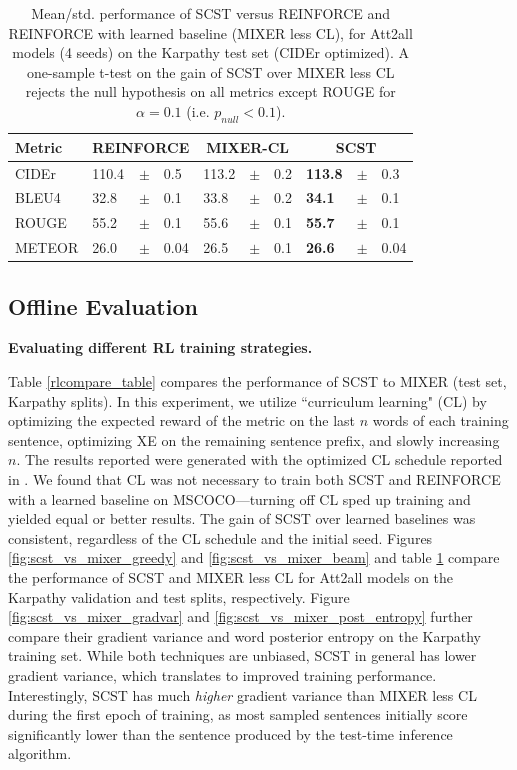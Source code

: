 \documentclass[10pt,twocolumn,letterpaper]{article}
\begin{document}
\begin{table}[th]
\begin{center}
\small\addtolength{\tabcolsep}{-2pt} 
\begin{tabular}{l|lrl|lrl|lrl}
\hline\hline
Metric &  \multicolumn{3}{c|}{REINFORCE} &   \multicolumn{3}{c|}{MIXER-CL} & \multicolumn{3}{c}{SCST} \\
\hline 
CIDEr				& 110.4&$\pm$& 0.5 	& 113.2&$\pm$& 0.2 		&	 \bf 113.8&$\pm$& 0.3 	\\  
BLEU4	   			& 32.8 &$\pm$& 0.1 		& 33.8&$\pm$&0.2		&	\bf	34.1 &$\pm$& 0.1 	\\
ROUGE			& 55.2 &$\pm$& 0.1		& 55.6&$\pm$&0.1		&	\bf	55.7 &$\pm$& 0.1 	\\
METEOR			& 26.0 &$\pm$& 0.04	& 26.5&$\pm$&0.1		&	 \bf 26.6 &$\pm$& 0.04  	\\
\hline\hline
\end{tabular}
\caption{Mean/std. performance of SCST versus REINFORCE and REINFORCE with learned baseline (MIXER less CL), for Att2all models (4 seeds) on the Karpathy test set (CIDEr optimized). A one-sample t-test on the gain of SCST over MIXER less CL rejects the null hypothesis on all metrics except ROUGE for $\alpha=0.1$ (i.e. $p_{null} < 0.1$).}
\label{rlcompare_table2}
\end{center}
\end{table}
\vspace{-0.15in}

\subsection{Offline Evaluation}

\noindent \textbf{Evaluating different RL training strategies.}

Table \ref{rlcompare_table} compares the performance of SCST to MIXER \cite{Ranzato} (test set, Karpathy splits). In this experiment, we utilize ``curriculum learning" (CL) by optimizing the expected reward of the metric on the last $n$ words of each training sentence, optimizing XE on the remaining sentence prefix, and slowly increasing $n$. The results reported were generated with the optimized CL schedule reported in  \cite{Ranzato}. We found that CL was not necessary to train both SCST and REINFORCE with a learned baseline on MSCOCO---turning off CL sped up training and yielded equal or better results. The gain of SCST over learned baselines was consistent, regardless of the CL schedule and the initial seed. Figures \ref{fig:scst_vs_mixer_greedy} and \ref{fig:scst_vs_mixer_beam} and table \ref{rlcompare_table2} compare the performance of SCST and MIXER less CL for Att2all models on the Karpathy validation and test splits, respectively. Figure \ref{fig:scst_vs_mixer_gradvar} and \ref{fig:scst_vs_mixer_post_entropy} further compare their gradient variance and word posterior entropy on the Karpathy training set. While both techniques are unbiased, SCST in general has lower gradient variance, which translates to improved training performance. Interestingly, SCST has much \emph{higher} gradient variance than MIXER less CL during the first epoch of training, as most sampled sentences initially score significantly lower than the sentence produced by the test-time inference algorithm.
\end{document}
